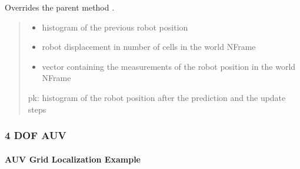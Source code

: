 \documentclass[letterpaper,10pt,english]{sphinxmanual}
\begin{document}
\begin{fulllineitems}
\begin{fulllineitems}
\end{fulllineitems}


\begin{fulllineitems}
\label{\detokenize{GridLocalization:GL.GL.Localize}}
\pysigstartsignatures
{}
\pysigstopsignatures
\sphinxAtStartPar
Overrides the parent method .
\begin{quote}\begin{description}
\begin{itemize}
\item {} 
\sphinxAtStartPar
{} \textendash{} histogram of the previous robot position

\item {} 
\sphinxAtStartPar
{} \textendash{} robot displacement in number of cells in the world N\sphinxhyphen{}Frame

\item {} 
\sphinxAtStartPar
{} \textendash{} vector containing the measurements of the robot position in the world N\sphinxhyphen{}Frame

\end{itemize}

\sphinxAtStartPar
pk: histogram of the robot position after the prediction and the update steps

\end{description}\end{quote}

\end{fulllineitems}


\end{fulllineitems}



\subsubsection{4 DOF AUV}
\label{\detokenize{GridLocalization:dof-auv}}

\paragraph{AUV Grid Localization Example}
\label{\detokenize{GridLocalization:auv-grid-localization-example}}
\begin{figure}[htbp]
\centering

\noindent{}
\end{figure}
\end{document}
